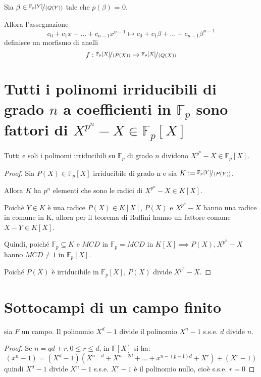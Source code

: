 \documentclass[10pt,a4paper,twoside]{book}
\begin{document}
Sia $\beta \in \nicefrac{\mathbb{F}_p[Y]}{\langle Q(Y)\rangle}$ tale che $p(\beta)$ = 0.

Allora l'assegnazione
\begin{equation*}
    c_0 + c_1 x + \ldots + c_{n-1} x^{n-1} \mapsto c_0 + c_1 \beta + \ldots + c_{n-1} \beta^{n-1}
\end{equation*}
definisce un morfismo di anelli
\begin{equation*}
    f: \nicefrac{\mathbb{F}_p[X]}{\langle P(X)\rangle} \rightarrow \nicefrac{\mathbb{F}_p[X]}{\langle Q(X)\rangle}
\end{equation*}

\newpage

\section{Tutti i polinomi irriducibili di grado \( n \) a
coefficienti in \(\mathbb{F}_p \) sono fattori di
\( X^{p^n} - X  \in \mathbb{F}_p [X]\)}

\begin{proposition}
    Tutti e soli i polinomi irriducibili su $\mathbb{F}_p$ di grado $n$ dividono $X^{p^n} - X \in \mathbb{F}_p[X]$.
\end{proposition}

\begin{proof}
    Sia $P(X) \in \mathbb{F}_p[X]$ irriducibile di grado n e sia $K := \nicefrac{\mathbb{F}_p[Y]}{\langle P(Y)\rangle}$.

    Allora $K$ ha $p^n$ elementi che sono le radici di $X^{p^n} - X \in K[X]$.

    Poichè $Y \in K$ è una radice $P(X) \in K[X]$, $P(X)$ e $X^{p^n} - X$ hanno una radice in comune in K, allora per il teorema di Ruffini hanno un fattore comune $X - Y \in K[X]$.

    Quindi, poiché $\mathbb{F}_p \subseteq K$ e $MCD$ in $\mathbb{F}_p = MCD$ in $K[X] \implies P(X), X^{p^n} - X$ hanno $MCD \neq 1$ in $\mathbb{F}_p[X]$.

    Poiché $P(X)$ è irriducibile in $\mathbb{F}_p[X]$, $P(X)$ divide $X^{p^n} - X$.
\end{proof}

\newpage

\section{Sottocampi di un campo finito}
\begin{lemma}
    sia $F$ un campo. Il polinomio $X^d - 1$ divide il polinomio $X^n - 1$ s.s.e. $d$ divide $n$.
\end{lemma}
\begin{proof}
    Se $n = qd + r, 0 \leq r \leq d$, in $\mathbb{F}[X]$ si ha:
    \begin{equation*}
        (x^n - 1) = (X^d - 1)(X^{n-d} + X^{n-2d} + \ldots + x^{n-(p-1)d} + X^r) + (X^r -1)
    \end{equation*}
    quindi $X^d - 1$ divide $X^n - 1$ s.s.e. $X^r - 1$ è il polinomio nullo, cioè s.s.e. $r = 0$
\end{proof}
\end{document}
